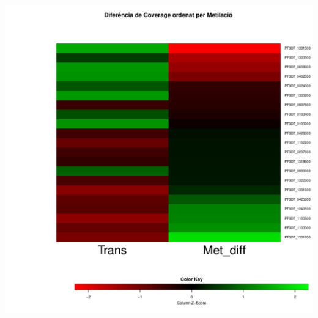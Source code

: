 \documentclass{article}\usepackage[]{graphicx}\usepackage[]{color}
\newenvironment{knitrout}{}{} %
\begin{document}
\begin{knitrout}
\color{fgcolor}

{\centering \includegraphics[width=.9\linewidth]{figure/minimal-_heat_cov_diff_metord-1} 

}



\end{knitrout}
\clearpage
\end{document}
